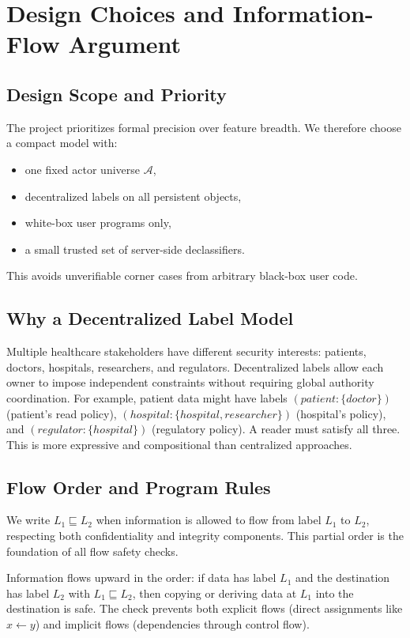 \section{Design Choices and Information-Flow Argument}

\subsection{Design Scope and Priority}

The project prioritizes formal precision over feature breadth. We therefore choose a compact model with:
\begin{itemize}
    \item one fixed actor universe $\mathcal{A}$,
    \item decentralized labels on all persistent objects,
    \item white-box user programs only,
    \item a small trusted set of server-side declassifiers.
\end{itemize}

This avoids unverifiable corner cases from arbitrary black-box user code.

\subsection{Why a Decentralized Label Model}

Multiple healthcare stakeholders have different security interests: patients, doctors, hospitals, researchers, and regulators. Decentralized labels allow each owner to impose independent constraints without requiring global authority coordination. For example, patient data might have labels $(patient:\{doctor\})$ (patient's read policy), $(hospital:\{hospital,researcher\})$ (hospital's policy), and $(regulator:\{hospital\})$ (regulatory policy). A reader must satisfy all three. This is more expressive and compositional than centralized approaches.

\subsection{Flow Order and Program Rules}

We write $L_1 \sqsubseteq L_2$ when information is allowed to flow from label $L_1$ to $L_2$, respecting both confidentiality and integrity components. This partial order is the foundation of all flow safety checks.

Information flows upward in the order: if data has label $L_1$ and the destination has label $L_2$ with $L_1 \sqsubseteq L_2$, then copying or deriving data at $L_1$ into the destination is safe. The check prevents both explicit flows (direct assignments like $x \leftarrow y$) and implicit flows (dependencies through control flow).

